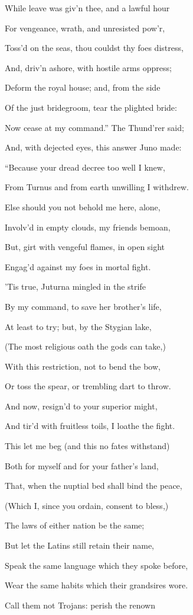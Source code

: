 While leave was giv’n thee, and a lawful hour

For vengeance, wrath, and unresisted pow’r,

Toss’d on the seas, thou couldst thy foes distress,

And, driv’n ashore, with hostile arms oppress;

Deform the royal house; and, from the side

Of the just bridegroom, tear the plighted bride:

Now cease at my command.” The Thund’rer said;

And, with dejected eyes, this answer Juno made:

“Because your dread decree too well I knew,

From Turnus and from earth unwilling I withdrew.

Else should you not behold me here, alone,

Involv’d in empty clouds, my friends bemoan,

But, girt with vengeful flames, in open sight

Engag’d against my foes in mortal fight.

’Tis true, Juturna mingled in the strife

By my command, to save her brother’s life,

At least to try; but, by the Stygian lake,

(The most religious oath the gods can take,)

With this restriction, not to bend the bow,

Or toss the spear, or trembling dart to throw.

And now, resign’d to your superior might,

And tir’d with fruitless toils, I loathe the fight.

This let me beg (and this no fates withstand)

Both for myself and for your father’s land,

That, when the nuptial bed shall bind the peace,

(Which I, since you ordain, consent to bless,)

The laws of either nation be the same;

But let the Latins still retain their name,

Speak the same language which they spoke before,

Wear the same habits which their grandsires wore.

Call them not Trojans: perish the renown

